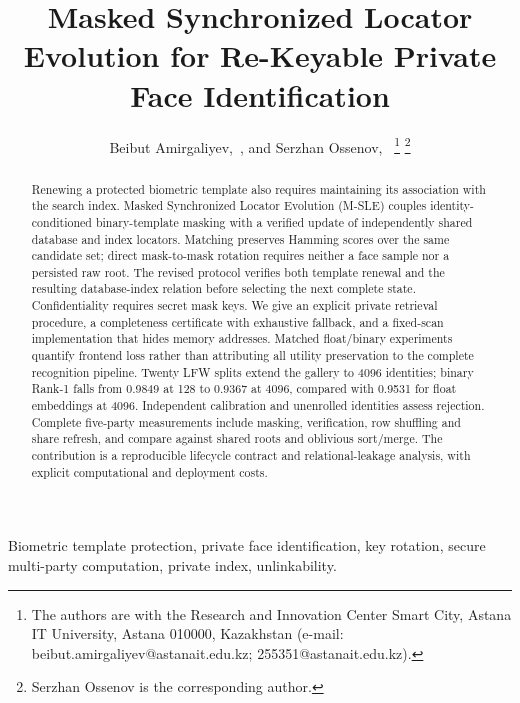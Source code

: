 \documentclass[journal]{IEEEtran}
\newcommand{\MSLE}{\textsc{M-SLE}\xspace}
\begin{document}
\title{Masked Synchronized Locator Evolution for Re-Keyable Private Face Identification}
\author{Beibut Amirgaliyev,~, and Serzhan Ossenov,~%
\thanks{The authors are with the Research and Innovation Center Smart City, Astana IT University, Astana 010000, Kazakhstan (e-mail: beibut.amirgaliyev@astanait.edu.kz; 255351@astanait.edu.kz).}%
\thanks{Serzhan Ossenov is the corresponding author.}}
\maketitle
\begin{abstract}
Renewing a protected biometric template also requires maintaining its association with the search index. Masked Synchronized Locator Evolution (\MSLE) couples identity-conditioned binary-template masking with a verified update of independently shared database and index locators. Matching preserves Hamming scores over the same candidate set; direct mask-to-mask rotation requires neither a face sample nor a persisted raw root. The revised protocol verifies both template renewal and the resulting database-index relation before selecting the next complete state. Confidentiality requires secret mask keys. We give an explicit private retrieval procedure, a completeness certificate with exhaustive fallback, and a fixed-scan implementation that hides memory addresses. Matched float/binary experiments quantify frontend loss rather than attributing all utility preservation to the complete recognition pipeline. Twenty LFW splits extend the gallery to 4096 identities; binary Rank-1 falls from 0.9849 at 128 to 0.9367 at 4096, compared with 0.9531 for float embeddings at 4096. Independent calibration and unenrolled identities assess rejection. Complete five-party measurements include masking, verification, row shuffling and share refresh, and compare against shared roots and oblivious sort/merge. The contribution is a reproducible lifecycle contract and relational-leakage analysis, with explicit computational and deployment costs.
\end{abstract}
\begin{IEEEkeywords}
Biometric template protection, private face identification, key rotation, secure multi-party computation, private index, unlinkability.
\end{IEEEkeywords}
\end{document}
